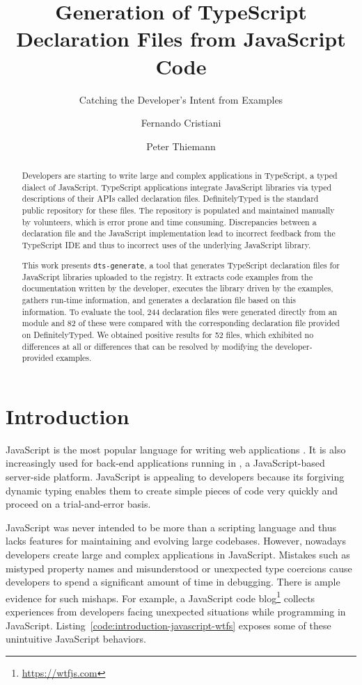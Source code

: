 \documentclass[english,cleveref,autoref,submission]{programming}
\title{Generation of TypeScript Declaration Files from JavaScript Code}
\subtitle{Catching the Developer's Intent from Examples}
\author{Fernando Cristiani}
\affiliation{Hochschule Karlsruhe, Germany}
\author{Peter Thiemann}
\affiliation{Albert-Ludwigs-Universität Freiburg, Germany}
\newcommand{\coderef}[1]{Listing~\ref{#1}}
\begin{document}
\maketitle

\begin{abstract}
Developers are starting to write large and complex applications in
TypeScript, a typed dialect of JavaScript. TypeScript applications
integrate JavaScript libraries via typed descriptions of their APIs
called declaration files. DefinitelyTyped is the standard public
repository for these files.
The repository is populated and maintained manually by volunteers, which
is error prone and time consuming. Discrepancies between a
declaration file and the JavaScript implementation lead to
incorrect feedback from the TypeScript IDE and thus to incorrect uses
of the underlying JavaScript library.

This work presents \texttt{dts-generate}, a tool that generates
TypeScript declaration files for JavaScript libraries uploaded to the \NPM{}
registry. It extracts code examples from the documentation written by
the developer, executes the library driven by the examples, gathers
run-time information, and generates a declaration file based on this
information. To evaluate the tool, 244 declaration files were
generated directly from an \NPM{} module and 82 of these were
compared with the corresponding declaration file provided on
DefinitelyTyped. We obtained positive results for 52 files, which
exhibited no differences at all or differences that can be resolved by
modifying the developer-provided examples. 
\end{abstract}

\section{Introduction}
\label{sec:introduction}
JavaScript is the most popular language for writing web
applications \cite{github-statistics}. It is also increasingly used
for back-end applications running in \NodeJS{}, a JavaScript-based
server-side platform. JavaScript is appealing to developers because
its forgiving dynamic typing enables 
them to create simple pieces of code very quickly and proceed on a
trial-and-error basis.

JavaScript was never intended to be more than a
scripting language and thus lacks features for maintaining and evolving large
codebases. However, nowadays developers create large and complex
applications in JavaScript. 
Mistakes such as mistyped property
names and misunderstood or unexpected type coercions cause developers
to spend a significant amount of time in debugging. There is ample
evidence for such mishaps. For example, a 
JavaScript code blog\footnote{\url{https://wtfjs.com}} collects experiences
from developers facing unexpected situations while programming in
JavaScript. \coderef{code:introduction-javascript-wtfs} exposes some
of these unintuitive JavaScript behaviors. 
\end{document}

